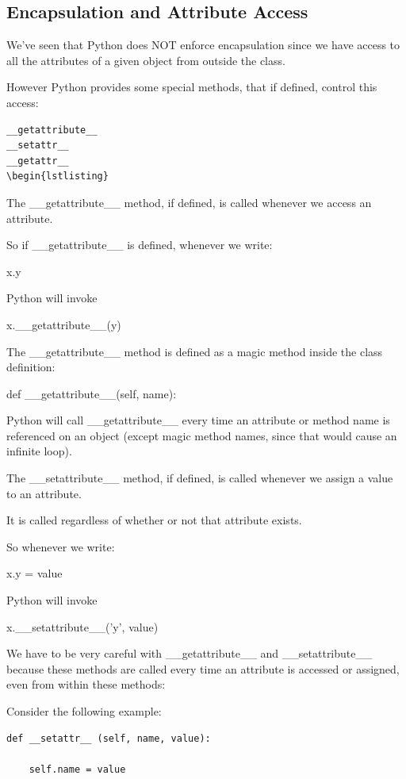 \documentclass{article}
\begin{document}
\subsection{Encapsulation and Attribute Access}

We've seen that Python does NOT enforce encapsulation since  we have access to all the attributes of a given object from outside the class.  

However Python provides some special methods, that if defined, control this access:

\begin{lstlisting}
__getattribute__
__setattr__
__getattr__
\begin{lstlisting}
\end{lstlisting}

The {\_}{\_}getattribute{\_}{\_} method, if defined, is called whenever we access an attribute.

So if {\_}{\_}getattribute{\_}{\_} is defined, whenever we write:

x.y 

Python will invoke 

x.{\_}{\_}getattribute{\_}{\_}(y)

The {\_}{\_}getattribute{\_}{\_} method is defined as a magic method inside the class definition:

def {\_}{\_}getattribute{\_}{\_}(self, name):

Python will call {\_}{\_}getattribute{\_}{\_} every time an attribute or method name is referenced on an object (except magic method names, since that would cause an infinite loop).

The {\_}{\_}setattribute{\_}{\_} method, if defined,  is called whenever we assign a value to an attribute.

It is called regardless of whether or not that attribute exists.

So whenever we write:

x.y = value

Python will invoke 

x.{\_}{\_}setattribute{\_}{\_}('y', value)

We have to be very careful with {\_}{\_}getattribute{\_}{\_} and {\_}{\_}setattribute{\_}{\_} because these methods are called every time an attribute is accessed or assigned, even from within these methods:

Consider the following example:

\begin{lstlisting}
def __setattr__ (self, name, value):

    self.name = value
\end{lstlisting}
\end{document}
